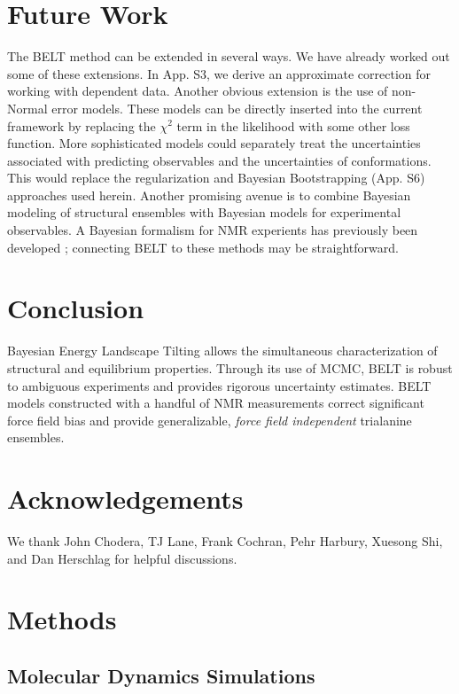 \documentclass[journal=jacsat,manuscript=article]{achemso}
\begin{document}
\section{Future Work}

The BELT method can be extended in several ways.  We have already worked out some of these extensions.  In App. S3, we derive an approximate correction for working with dependent data.  Another obvious extension is the use of non-Normal error models.  These models can be directly inserted into the current framework by replacing the $\chi^2$ term in the likelihood with some other loss function.  More sophisticated models could separately treat the uncertainties associated with predicting observables and the uncertainties of conformations.  This would replace the regularization and Bayesian Bootstrapping (App. S6) approaches used herein.  Another promising avenue is to combine Bayesian modeling of structural ensembles with Bayesian models for experimental observables.  A Bayesian formalism for NMR experients has previously been developed \cite{rieping2005, habeck2006}; connecting BELT to these methods may be straightforward.  


\section{Conclusion}

Bayesian Energy Landscape Tilting allows the simultaneous characterization of structural and equilibrium properties.  Through its use of MCMC, BELT is robust to ambiguous experiments and provides rigorous uncertainty estimates.  BELT models constructed with a handful of NMR measurements correct significant force field bias and provide generalizable, \emph{force field independent} trialanine ensembles.  


\section{Acknowledgements}

We thank John Chodera, TJ Lane, Frank Cochran, Pehr Harbury, Xuesong Shi, and Dan Herschlag for helpful discussions.  

\section{Methods}

\subsection{Molecular Dynamics Simulations}
\end{document}
